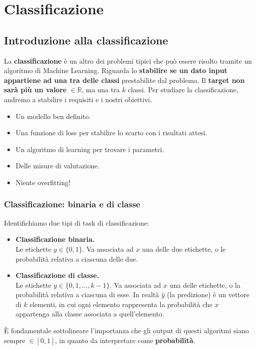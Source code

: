\chapter{Classificazione}\label{chap:classificazione}

\section{Introduzione alla classificazione}
La \textbf{classificazione} è un altro dei problemi tipici che può essere risolto tramite un algoritmo di Machine Learning. Riguarda lo \textbf{stabilire se un dato input appartiene ad una tra delle classi} prestabilite dal problema. Il\textbf{ target non sarà più un valore} $\in \mathbb{R}$, ma una tra $k$ classi.
Per studiare la classificazione, andremo a stabilire i requisiti e i nostri obiettivi.
\begin{itemize}
	\item Un modello ben definito.
	\item Una funzione di loss per stabilire lo scarto con i risultati attesi.
	\item Un algoritmo di learning per trovare i parametri.
	\item Delle misure di valutazione.
	\item Niente overfitting!
\end{itemize}

\subsection{Classificazione: binaria e di classe}
Identifichiamo due tipi di task di classificazione:

\begin{itemize}
	\item \textbf{Classificazione binaria.}\\
	Le etichette $y \in \{ 0,1\}$. Va associata ad $x$ una delle due etichette, o le probabilità relativa a ciascuna delle due.
	\item \textbf{Classificazione di classe.}\\
	Le etichette $y \in \{ 0,1, \dots, k-1\}$. Va associata ad $x$ una delle etichette, o la probabilità relativa a ciascuna di esse. In realtà $\hat{y}$ (la predizione) è un vettore di $k$ elementi, in cui ogni elemento rappresenta la probabilità che $x$ appartenga alla classe associata a quell'elemento.
\end{itemize}

È fondamentale sottolineare l'importanza che gli output di questi algoritmi siano sempre $\in[0,1]$, in quanto da interpretare come \textbf{probabilità}.
